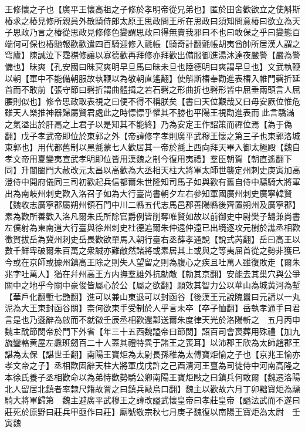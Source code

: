 王修懷之子也【廣平王懷高祖之子修於孝明帝從兄弟也】匿於田舍歡欲立之使斛斯椿求之椿見修所親員外散騎侍郎太原王思政問王所在思政曰須知問意椿曰欲立為天子思政乃言之椿從思政見修修色變謂思政曰得無賣我邪曰不也曰敢保之乎曰變態百端何可保也椿馳報歡歡遣四百騎迎修入氈帳【騎奇計翻氈帳胡夷酋帥所居漢人謂之穹廬】陳誠泣下霑襟修讓以寡德歡再拜修亦拜歡出備服御進湯沐達夜嚴警【嚴為警備也】昧爽【孔安國曰昧冥爽明早旦馬曰昧未旦也陸德明曰爽謂早旦也】文武執鞭以朝【軍中不能備朝服故執鞭以為敬朝直遙翻】使斛斯椿奉勸進表椿入帷門磬折延首而不敢前【張守節曰磬折謂曲體揖之若石磬之形曲折也磬形皆中屈垂兩頭言人屈腰則似也】修令思政取表視之曰便不得不稱朕矣【書曰天位艱哉又曰毋安厥位惟危雖天人樂推神器歸屬賢君處此之時慓慓乎懼其不勝也平陽王視勸進表而此言驕滿之氣溢出於肝鬲之上君子以是知其不能終】乃為安定王作詔策而禪位焉【為于偽翻】戊子孝武帝即位於東郭之外【帝諱修字孝則廣平武穆王懷之第三子也東郭洛城東郭也】用代都舊制以黑氈蒙七人歡居其一帝於氈上西向拜天畢入御太極殿【魏自孝文帝用夏變夷宣武孝明即位皆用漢魏之制今復用夷禮】羣臣朝賀【朝直遙翻下同】升閶闔門大赦改元太昌以高歡為大丞相天柱大將軍太師世襲定州刺史庚寅加高澄侍中開府儀同三司初歡起兵信都爾朱世隆知司馬子如與歡有舊自侍中驃騎大將軍出為南岐州刺史歡入洛召子如為大行臺尚書朝夕左右參知軍國廣州刺史廣寧韓賢【魏收志廣寧郡屬朔州領石門中川二縣五代志馬邑郡善陽縣後齊置朔州及廣寧郡】素為歡所善歡入洛凡爾朱氏所除官爵例皆削奪唯賢如故以前御史中尉樊子鵠兼尚書左僕射為東南道大行臺與徐州刺史杜德追爾朱仲遠仲遠已出境逐攻元樹於譙丞相歡徵賀拔岳為冀州刺史岳畏歡欲單馬入朝行臺右丞薛孝通說【說式芮翻】岳曰高王以數千鮮卑破爾朱百萬之衆誠亦難敵然諸將或素居其上或與之等夷屈首從之勢非獲已今或在京師或據州鎮高王除之則失人望留之則為腹心之疾且吐萬人雖復敗走【爾朱兆字吐萬人】猶在幷州高王方内撫羣雄外抗勍敵【勍其京翻】安能去其巢穴與公爭關中之地乎今關中豪俊皆屬心於公【屬之欲翻】願效其智力公以華山為城黄河為塹【華戶化翻塹七艷翻】進可以兼山東退可以封函谷【後漢王元說隗囂曰元請以一丸泥為大王東封函谷關】柰何欲東手受制於人乎言未卒【卒子恤翻】岳執孝通手曰君言是也乃遜辭為啟而不就徵壬辰丞相歡還鄴送爾朱度律天光於洛陽斬之　五月丙申魏主酖節閔帝於門下外省【年三十五西魏謚帝曰節閔】詔百司會喪葬用殊禮【加九旒鑾輅黄屋左纛班劒百二十人蓋其禮特異于諸王之喪耳】以沛郡王欣為太師趙郡王諶為太保【諶世壬翻】南陽王寶炬為太尉長孫稚為太傅寶炬愉之子也【京兆王愉亦孝文帝之子】丞相歡固辭天柱大將軍戊戌許之己酉清河王亶為司徒侍中河南高隆之本徐氏養子丞相歡命以為弟恃歡勢驕公卿南陽王寶炬敺之曰鎮兵何敢爾【魏遷洛陽北人留居北鎮者率隸尺籍故詈之曰鎮兵敺烏口翻】魏主以歡故六月丁卯黜寶炬為驃騎大將軍歸第　魏主避廣平武穆王之諱改謚武懷皇帝曰孝莊皇帝【謚法武而不遂曰莊死於原野曰莊兵甲亟作曰莊】廟號敬宗秋七月庚子魏復以南陽王寶炬為太尉　壬寅魏

